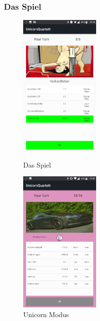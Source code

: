 \documentclass{scrartcl}
\begin{document}
\subsubsection{Das Spiel}
\begin{figure}[!ht]
  \centering
  \begin{minipage}{0.45\textwidth}
    \centering
    \includegraphics[width=4cm]{img/game.png}
    \caption{Das Spiel}
  \end{minipage}
  \hfill
  \begin{minipage}{0.45\textwidth}
    \centering
    \includegraphics[width=4cm]{img/unicorn.png}
    \caption{Unicorn Modus}
  \end{minipage}
\end{figure}
\end{document}
